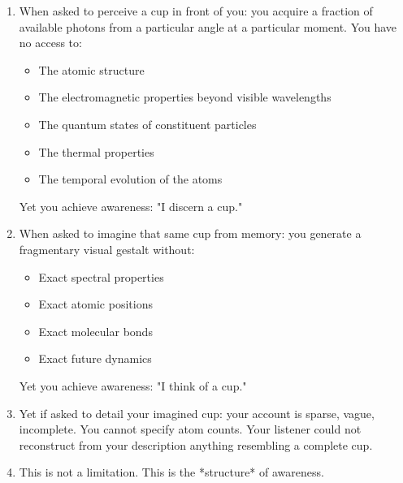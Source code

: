 \begin{observation}
\label{obs:universal-incomplete}
\begin{enumerate}[label=(\arabic*),leftmargin=*]
\item When asked to perceive a cup in front of you: you acquire a fraction of available photons from a particular angle at a particular moment. You have no access to:
\begin{itemize}
\item The atomic structure
\item The electromagnetic properties beyond visible wavelengths
\item The quantum states of constituent particles
\item The thermal properties
\item The temporal evolution of the atoms
\end{itemize}
Yet you achieve awareness: "I discern a cup."

\item When asked to imagine that same cup from memory: you generate a fragmentary visual gestalt without:
\begin{itemize}
\item Exact spectral properties
\item Exact atomic positions
\item Exact molecular bonds
\item Exact future dynamics
\end{itemize}
Yet you achieve awareness: "I think of a cup."

\item Yet if asked to detail your imagined cup: your account is sparse, vague, incomplete. You cannot specify atom counts. Your listener could not reconstruct from your description anything resembling a complete cup.

\item This is not a limitation. This is the *structure* of awareness.
\end{enumerate}
\end{observation}

